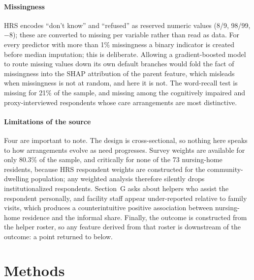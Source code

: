 \documentclass[9pt,twoside]{pnas-new}
\begin{document}
\paragraph{Missingness} HRS encodes ``don't know'' and ``refused'' as reserved
numeric values (8/9, 98/99, $-8$); these are converted to missing per variable
rather than read as data. For every predictor with more than 1\% missingness a
binary indicator is created before median imputation; this is deliberate. Allowing a gradient-boosted model to route missing values
down its own default branches would fold the fact of missingness into the
SHAP attribution of the parent feature, which misleads when missingness is not
at random, and here it is not. The word-recall test is missing for 21\%
of the sample, and missing among the cognitively impaired and
proxy-interviewed respondents whose care arrangements are most distinctive.

\paragraph{Limitations of the source} Four are important to note. The design is
cross-sectional, so nothing here speaks to how arrangements evolve as need
progresses. Survey weights are available for only 80.3\% of the sample, and
critically for none of the 73 nursing-home residents, because HRS respondent
weights are constructed for the community-dwelling population; any weighted
analysis therefore silently drops institutionalized respondents. Section~G asks
about helpers who assist the respondent personally, and facility staff appear
under-reported relative to family visits, which produces a counterintuitive
positive association between nursing-home residence and the informal share.
Finally, the outcome is constructed from the helper roster, so any feature
derived from that roster is downstream of the outcome: a point returned to
below.

\section*{Methods}
\end{document}

